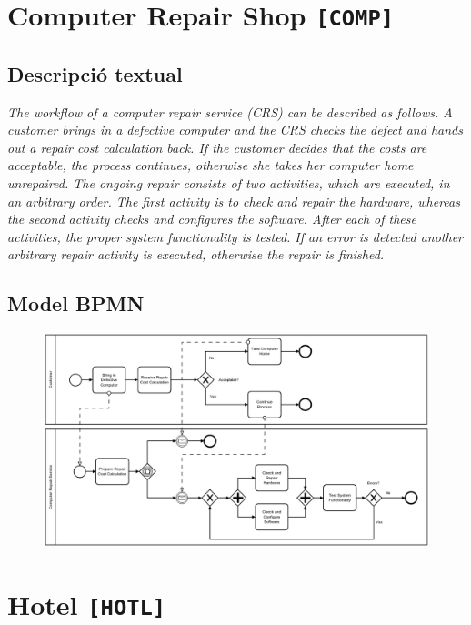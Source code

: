 \clearpage


\section{Computer Repair Shop \texttt{[COMP]}}

\subsection*{Descripció textual}

\textit{The workflow of a computer repair service (CRS) can be described as follows. A customer brings in a defective computer and the CRS checks the defect and hands out a repair cost calculation back. If the customer decides that the costs are acceptable, the process continues, otherwise she takes her computer home unrepaired. The ongoing repair consists of two activities, which are executed, in an arbitrary order. The first activity is to check and repair the hardware, whereas the second activity checks and configures the software. After each of these activities, the proper system functionality is tested. If an error is detected another arbitrary repair activity is executed, otherwise the repair is finished.}

\subsection*{Model BPMN}

\begin{figure}[!h]
    \centering
    \includegraphics[width=\textwidth]{figures/benchmark/Computer_Repair.png}
\end{figure}

\clearpage

\section{Hotel \texttt{[HOTL]}}

